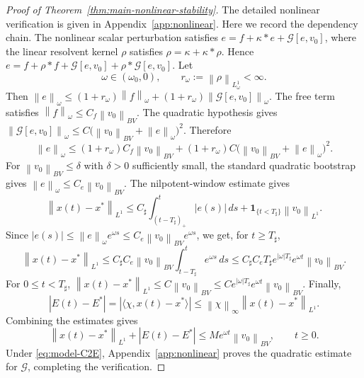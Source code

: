 \documentclass[pdflatex,sn-mathphys-num]{sn-jnl}
\theoremstyle{thmstyleone}
\theoremstyle{definition}
\theoremstyle{remark}
\newcommand{\Gcal}{\mathcal{G}}
\newcommand{\norm}[1]{\left\lVert#1\right\rVert}
\newcommand{\abs}[1]{\left\lvert#1\right\rvert}
\numberwithin{equation}{section}
\begin{document}
\begin{proof}[Proof of Theorem~\ref{thm:main-nonlinear-stability}]
The detailed nonlinear verification is given in Appendix~\ref{app:nonlinear}.
Here we record the dependency chain.
The nonlinear scalar perturbation satisfies
$\displaystyle 
e=f+\kappa*e+\Gcal[e,v_0]$,
where the linear resolvent kernel \(\rho\) satisfies
$\displaystyle 
\rho=\kappa+\kappa*\rho$.
Hence
$e
=
f+\rho*f+\Gcal[e,v_0]+\rho*\Gcal[e,v_0]$.
Let
\[
\omega\in(\omega_0,0),
\qquad
r_\omega:=\norm{\rho}_{L^1_\omega}<\infty.
\]
Then
$\displaystyle 
\norm{e}_\omega
\le
(1+r_\omega)\norm{f}_\omega
+
(1+r_\omega)\norm{\Gcal[e,v_0]}_\omega$.
The free term satisfies
$\displaystyle 
\norm{f}_\omega
\le
C_f\norm{v_0}_{BV}$.
The quadratic hypothesis gives
$\displaystyle 
\norm{\Gcal[e,v_0]}_\omega
\le
C\big(\norm{v_0}_{BV}+\norm{e}_\omega\big)^2$.
Therefore
\[
\norm{e}_\omega
\le
(1+r_\omega)C_f\norm{v_0}_{BV}
+
(1+r_\omega)C\big(\norm{v_0}_{BV}+\norm{e}_\omega\big)^2.
\]
For
$\norm{v_0}_{BV}\le\delta$ with $\delta>0$ sufficiently small,
the standard quadratic bootstrap gives
$\displaystyle 
\norm{e}_\omega
\le
C_e\norm{v_0}_{BV}$.
The nilpotent-window estimate gives
\[
\norm{x(t)-x^*}_{L^1}
\le
C_\sharp\int_{(t-T_\sharp)_+}^{t}\abs{e(s)}\,ds
+
\mathbf 1_{\{t<T_\sharp\}}\norm{v_0}_{L^1}.
\]
Since
$\displaystyle 
\abs{e(s)}
\le
\norm{e}_\omega e^{\omega s}
\le
C_e\norm{v_0}_{BV}e^{\omega s}$,
we get, for \(t\ge T_\sharp\),
\[
\norm{x(t)-x^*}_{L^1}
\le
C_\sharp C_e\norm{v_0}_{BV}
\int_{t-T_\sharp}^{t}e^{\omega s}\,ds
\le
C_\sharp C_e T_\sharp e^{|\omega|T_\sharp}
e^{\omega t}\norm{v_0}_{BV}.
\]
For \(0\le t<T_\sharp\),
$\displaystyle 
\norm{x(t)-x^*}_{L^1}
\le
C\norm{v_0}_{BV}
\le
Ce^{|\omega|T_\sharp}e^{\omega t}\norm{v_0}_{BV}$.
Finally,
\[
\abs{E(t)-E^*}
=
\abs{\langle\chi,x(t)-x^*\rangle}
\le
\norm{\chi}_{\infty}\norm{x(t)-x^*}_{L^1}.
\]
Combining the estimates gives
\[
\norm{x(t)-x^*}_{L^1}+\abs{E(t)-E^*}
\le
M e^{\omega t}\norm{v_0}_{BV},
\qquad
t\ge0.
\]
Under \eqref{eq:model-C2E}, Appendix~\ref{app:nonlinear} proves the quadratic
estimate for \(\Gcal\), completing the verification.
\end{proof}
\end{document}
